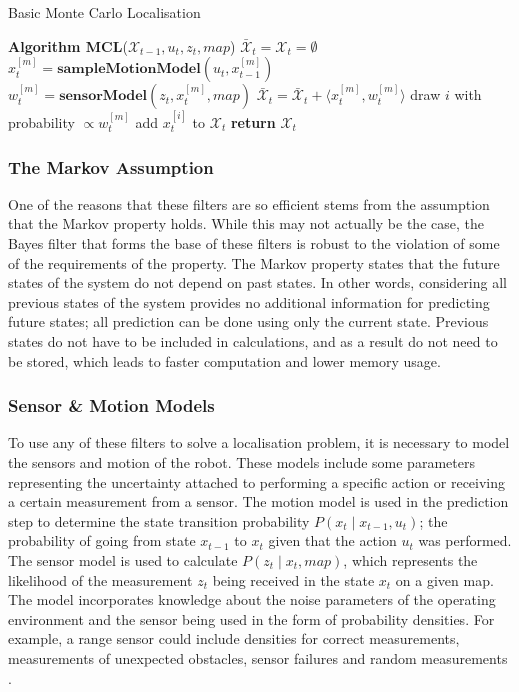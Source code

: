 \documentclass[conference]{IEEEtran}
\begin{document}
\begin{algorithm}
  \caption{Basic Monte Carlo Localisation \cite{thrun}}
  \label{alg:basicMCL}
  \begin{algorithmic}[1]
    \State \textbf{Algorithm MCL}\textnormal{($\mathcal{X}_{t-1}, u_t, z_t, map$)}
    \State $\bar{\mathcal{X}}_t=\mathcal{X}_t=\emptyset$
    \State $x_t^{[m]}=\textbf{sampleMotionModel}(u_t,x_{t-1}^{[m]})$
    \State $w_t^{[m]}=\textbf{sensorModel}(z_t,x_t^{[m]},map)$
    \State $\bar{\mathcal{X}}_t=\bar{\mathcal{X}}_t+\langle x_t^{[m]},w_t^{[m]}\rangle$
    \EndFor
    \State \textnormal{draw $i$ with probability $\propto w_t^{[m]}$}
    \State \textnormal{add $x_t^{[i]}$ to $\mathcal{X}_t$}
    \EndFor
    \State \textbf{return} $\mathcal{X}_t$
  \end{algorithmic}
\end{algorithm}

\subsubsection{The Markov Assumption}
One of the reasons that these filters are so efficient stems from the assumption that the Markov property holds. While this may not actually be the case, the Bayes filter that forms the base of these filters is robust to the violation of some of the requirements of the property. The Markov property states that the future states of the system do not depend on past states. In other words, considering all previous states of the system provides no additional information for predicting future states; all prediction can be done using only the current state. Previous states do not have to be included in calculations, and as a result do not need to be stored, which leads to faster computation and lower memory usage.

\subsubsection{Sensor \& Motion Models}
To use any of these filters to solve a localisation problem, it is necessary to model the sensors and motion of the robot. These models include some parameters representing the uncertainty attached to performing a specific action or receiving a certain measurement from a sensor. The motion model is used in the prediction step to determine the state transition probability $P(x_t\mid x_{t-1}, u_t)$; the probability of going from state $x_{t-1}$ to $x_t$ given that the action $u_t$ was performed. The sensor model is used to calculate $P(z_t\mid x_t,map)$, which represents the likelihood of the measurement $z_t$ being received in the state $x_t$ on a given map. The model incorporates knowledge about the noise parameters of the operating environment and the sensor being used in the form of probability densities. For example, a range sensor could include densities for correct measurements, measurements of unexpected obstacles, sensor failures and random measurements \cite{thrun}. 
\end{document}
